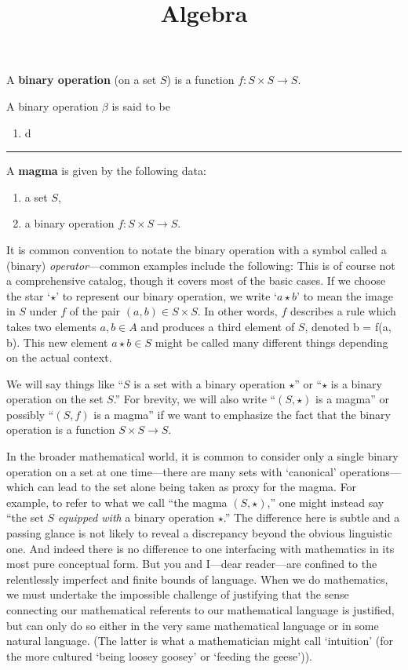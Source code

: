 \documentclass[12pt]{article}
\title{Algebra \\
    \large 
}
\author{}
\date{}
\newcommand{\keyword}[1]{\textbf{#1}}
\def\[#1\]{\begin{align*}#1\end{align*}}
\newcommand{\sepline}{\rule{\textwidth}{0.4pt}}
\theoremstyle{definition}
\newcommand{\<}{\left\langle}
\renewcommand{\>}{\right\rangle}
\begin{document}
A \keyword{binary operation} (on a set $S$) is a function $f : S \times S \to S$.

A binary operation $\beta$ is said to be
\begin{enumerate}
    \item d
\end{enumerate}

\sepline

A \keyword{magma} is given by the following data:
\begin{enumerate}[$\bullet$]
    \item a set $S$,
    \item a binary operation $f : S \times S \to S$.
\end{enumerate}

It is common convention to notate the binary operation with a symbol called a (binary) \emph{operator}---common examples include the following:
\[
    + \quad \times \quad \cdot \quad * \quad \star \quad \circ
\]
This is of course not a comprehensive catalog, though it covers most of the basic cases.
If we choose the star `$\star$' to represent our binary operation, we write `$a \star b$' to mean the image in $S$ under $f$ of the pair $(a, b) \in S \times S$.
In other words, $f$ describes a rule which takes two elements $a, b \in A$ and produces a third element of $S$, denoted 
\[
    a \star b = f(a, b).
\]
This new element $a \star b \in S$ might be called many different things depending on the actual context.

We will say things like ``$S$ is a set with a binary operation $\star$'' or ``$\star$ is a binary operation on the set $S$.''
For brevity, we will also write ``$(S, \star)$ is a magma'' or possibly ``$(S, f)$ is a magma'' if we want to emphasize the fact that the binary operation is a function $S \times S \to S$.

In the broader mathematical world, it is common to consider only a single binary operation on a set at one time---there are many sets with `canonical' operations---which can lead to the set alone being taken as proxy for the magma.
For example, to refer to what we call ``the magma $(S, \star)$,'' one might instead say ``the set $S$ \textit{equipped with} a binary operation $\star$.''
The difference here is subtle and a passing glance is not likely to reveal a discrepancy beyond the obvious linguistic one.
And indeed there is no difference to one interfacing with mathematics in its most pure conceptual form.
But you and I---dear reader---are confined to the relentlessly imperfect and finite bounds of language.
When we do mathematics, we must undertake the impossible challenge of justifying that the sense connecting our mathematical referents to our mathematical language is justified, but can only do so either in the very same mathematical language or in some natural language.
(The latter is what a mathematician might call `intuition' (for the more cultured `being loosey goosey' or `feeding the geese')).
\end{document}

